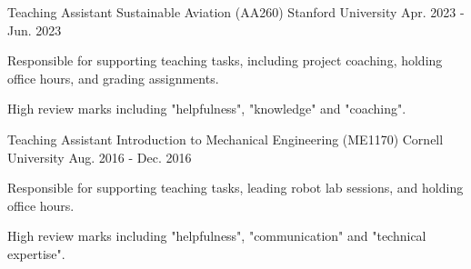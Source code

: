 \begin{cventries}
  \cventry
    {Teaching Assistant} %
    {Sustainable Aviation (AA260)} %
    {Stanford University} %
    {Apr. 2023 - Jun. 2023} %
    {
      \begin{cvitems} %
        \item {Responsible for supporting teaching tasks, including project coaching, holding office hours, and grading assignments.}
        \item {High review marks including "helpfulness", "knowledge" and "coaching".}
      \end{cvitems}
    }
  \cventry
    {Teaching Assistant} %
    {Introduction to Mechanical Engineering (ME1170)} %
    {Cornell University} %
    {Aug. 2016 - Dec. 2016} %
    {
      \begin{cvitems} %
        \item {Responsible for supporting teaching tasks, leading robot lab sessions, and holding office hours.}
        \item {High review marks including "helpfulness", "communication" and "technical expertise".}
      \end{cvitems}
    }


\end{cventries}
